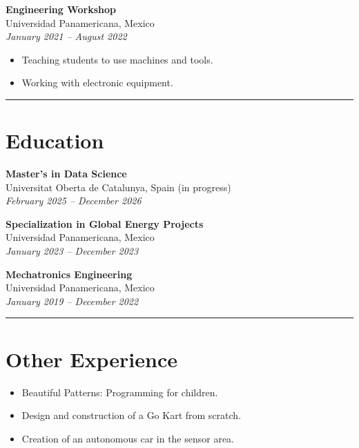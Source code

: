 \documentclass[11pt,a4paper]{article}
\begin{document}
\begin{minipage}[t]{0.65\textwidth}
\vspace{1em} %

\textbf{Engineering Workshop} \\
Universidad Panamericana, Mexico \\
\textit{January 2021 -- August 2022}
\begin{itemize}
    \item Teaching students to use machines and tools.
    \item Working with electronic equipment.
\end{itemize}

\vspace*{2em}
{\color{lightgray}\hrule}

\section*{Education}
\footnotesize

\textbf{Master's in Data Science} \\
Universitat Oberta de Catalunya, Spain (in progress) \\
\textit{February 2025 -- December 2026}

\vspace{1em} %

\textbf{Specialization in Global Energy Projects} \\
Universidad Panamericana, Mexico \\
\textit{January 2023 -- December 2023}

\vspace{1em} %

\textbf{Mechatronics Engineering} \\
Universidad Panamericana, Mexico \\
\textit{January 2019 -- December 2022}

\vspace*{2em}
{\color{lightgray}\hrule}

\section*{Other Experience}
\footnotesize
\begin{itemize}
    \item Beautiful Patterns: Programming for children.
    \item Design and construction of a Go Kart from scratch.
    \item Creation of an autonomous car in the sensor area.
\end{itemize}

\vspace*{\fill}

\end{minipage}
\end{document}
